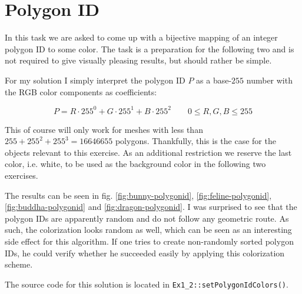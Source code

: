 \documentclass[a4paper,10pt,notitlepage]{scrreprt}
\begin{document}
\pagebreak

\section{Polygon ID}

In this task we are asked to come up with a bijective mapping of an integer
polygon ID to some color. The task is a preparation for the following two and
is not required to give visually pleasing results, but should rather be simple.

For my solution I simply interpret the polygon ID $P$ as a base-$255$ number
with the RGB color components as coefficients:

\begin{equation}
 P = R \cdot 255^0 + G \cdot 255^1 + B \cdot 255^2 \qquad 0 \leq R,G,B \leq
255
\end{equation}

This of course will only work for meshes with less than
$255+255^2+255^3=16646655$ polygons. Thankfully, this is the case for the
objects relevant to this exercise. As an additional restriction we reserve the
last color, i.e. white, to be used as the background color in the following two
exercises.

The results can be seen in fig. \ref{fig:bunny-polygonid},
\ref{fig:feline-polygonid}, \ref{fig:buddha-polygonid} and
\ref{fig:dragon-polygonid}. I was
surprised to see that the polygon IDs are apparently random and do not follow
any geometric route. As such, the colorization looks random as well, which can
be seen as an interesting side effect for this algorithm. If one tries to
create non-randomly sorted polygon IDs, he could verify whether he succeeded
easily by applying this colorization scheme.

The source code for this solution is located in
\texttt{Ex1\_2::setPolygonIdColors()}.
\end{document}
